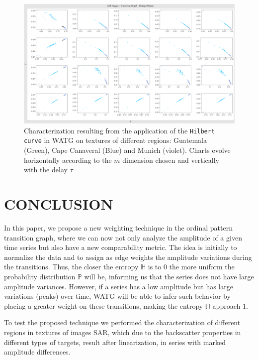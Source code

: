 \documentclass{isprs}
\begin{document}
	\begin{figure}
		\centering
		\includegraphics[width=1.05\textwidth]{Figures/transitionGraphHilbert.pdf}
		\caption{Characterization resulting from the application of the \texttt{Hilbert curve} in WATG on textures of different regions: Guatemala (Green), Cape Canaveral (Blue) and Munich (violet). Charts evolve horizontally according to the $m$ dimension chosen and vertically with the delay $\tau$}
		\label{fig:Regions}
	\end{figure}
	
	
	\section{CONCLUSION}\label{Conclusion}
	
	In this paper, we propose a new weighting technique in the ordinal pattern transition graph, where we can now not only analyze the amplitude of a given time series but also have a new comparability metric.
	The idea is initially to normalize the data and to assign as edge weights the amplitude variations during the transitions.
	Thus, the closer the entropy $\mathbb{H}$ is to $0$ the more uniform the probability distribution $\mathbb{P}$ will be, informing us that the series does not have large amplitude variances.
	However, if a series has a low amplitude but has large variations (peaks) over time, WATG will be able to infer such behavior by placing a greater weight on these transitions, making the entropy $\mathbb{H}$ approach $1$.
	
	To test the proposed technique we performed the characterization of different regions in textures of images SAR, which due to the backscatter properties in different types of targets, result after linearization, in series with marked amplitude differences.
	
\end{document}
